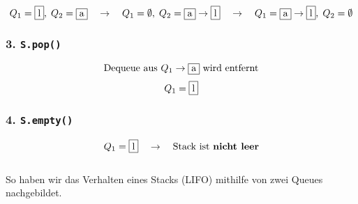 \documentclass[a4paper,12pt]{article}
\begin{document}
\[
Q_1 = \fbox{l},\; Q_2 = \fbox{a} \quad \rightarrow \quad Q_1 = \emptyset,\; Q_2 = \fbox{a} \rightarrow \fbox{l} \quad \rightarrow \quad Q_1 = \fbox{a} \rightarrow \fbox{l},\; Q_2 = \emptyset
\]

\subsubsection*{3. \texttt{S.pop()}}

\[
\text{Dequeue aus } Q_1 \rightarrow \fbox{a} \text{ wird entfernt}
\]
\[
Q_1 = \fbox{l}
\]

\subsubsection*{4. \texttt{S.empty()}}

\[
Q_1 = \fbox{l} \quad \rightarrow \quad \text{Stack ist \textbf{nicht leer}}
\]\\

So haben wir das Verhalten eines Stacks (LIFO) mithilfe von zwei Queues nachgebildet.
\end{document}
